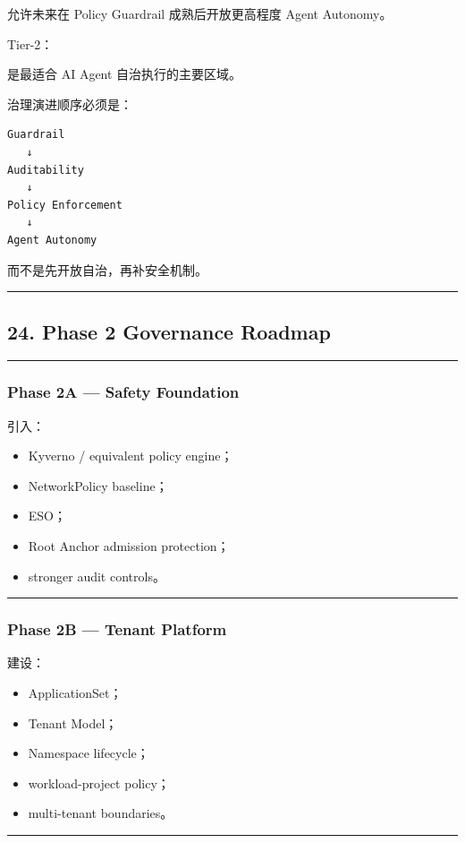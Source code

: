 \documentclass[11pt,a4paper]{article}
\begin{document}
允许未来在 Policy Guardrail 成熟后开放更高程度 Agent Autonomy。

Tier-2：

是最适合 AI Agent 自治执行的主要区域。

治理演进顺序必须是：

\begin{lstlisting}[language=text]
Guardrail
   ↓
Auditability
   ↓
Policy Enforcement
   ↓
Agent Autonomy
\end{lstlisting}
而不是先开放自治，再补安全机制。

\vspace{0.5em}\hrule\vspace{0.5em}
\subsection{24. Phase 2 Governance Roadmap}
\vspace{0.5em}\hrule\vspace{0.5em}
\subsubsection{Phase 2A — Safety Foundation}
引入：

\begin{itemize}
  \item Kyverno / equivalent policy engine；
  \item NetworkPolicy baseline；
  \item ESO；
  \item Root Anchor admission protection；
  \item stronger audit controls。
\end{itemize}
\vspace{0.5em}\hrule\vspace{0.5em}
\subsubsection{Phase 2B — Tenant Platform}
建设：

\begin{itemize}
  \item ApplicationSet；
  \item Tenant Model；
  \item Namespace lifecycle；
  \item workload-project policy；
  \item multi-tenant boundaries。
\end{itemize}
\vspace{0.5em}\hrule\vspace{0.5em}
\end{document}
